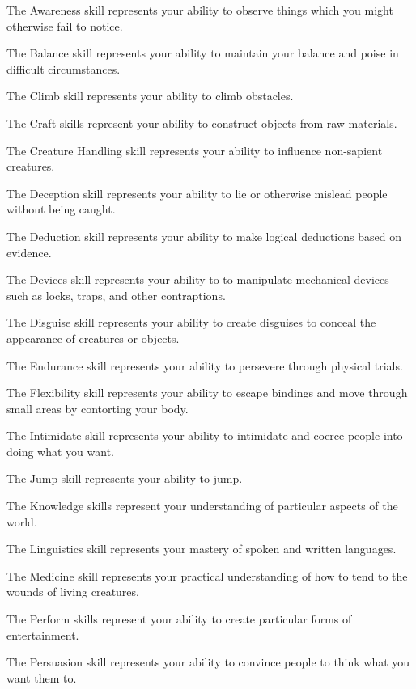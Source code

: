    \begin{raggeditemize}
        \item The Awareness skill represents your ability to observe things which you might otherwise fail to notice.
        \item The Balance skill represents your ability to maintain your balance and poise in difficult circumstances.
        \item The Climb skill represents your ability to climb obstacles.
        \item The Craft skills represent your ability to construct objects from raw materials.
        \item The Creature Handling skill represents your ability to influence non-sapient creatures.
        \item The Deception skill represents your ability to lie or otherwise mislead people without being caught.
        \item The Deduction skill represents your ability to make logical deductions based on evidence.
        \item The Devices skill represents your ability to to manipulate mechanical devices such as locks, traps, and other contraptions.
        \item The Disguise skill represents your ability to create disguises to conceal the appearance of creatures or objects.
        \item The Endurance skill represents your ability to persevere through physical trials.
        \item The Flexibility skill represents your ability to escape bindings and move through small areas by contorting your body.
        \item The Intimidate skill represents your ability to intimidate and coerce people into doing what you want.
        \item The Jump skill represents your ability to jump.
        \item The Knowledge skills represent your understanding of particular aspects of the world.
        \item The Linguistics skill represents your mastery of spoken and written languages.
        \item The Medicine skill represents your practical understanding of how to tend to the wounds of living creatures.
        \item The Perform skills represent your ability to create particular forms of entertainment.
        \item The Persuasion skill represents your ability to convince people to think what you want them to.

\end{raggeditemize}
